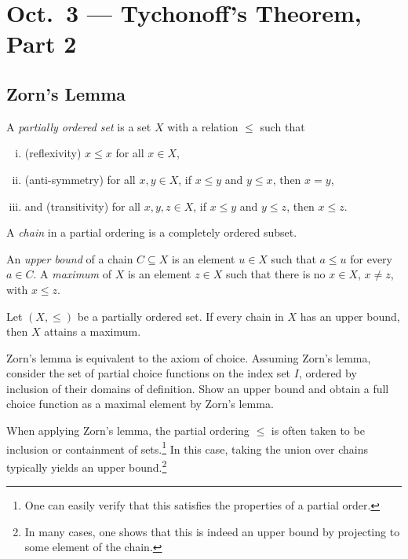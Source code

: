 \chapter{Oct.~3 --- Tychonoff's Theorem, Part 2}

\section{Zorn's Lemma}

\begin{definition}
  A \emph{partially ordered set} is a set $X$ with
  a relation $\le$ such that
  \begin{enumerate}[(i)]
    \item (reflexivity) $x \le x$ for all
      $x \in X$,
    \item (anti-symmetry) for all $x, y \in X$,
      if $x \le y$ and $y \le x$, then $x = y$,
    \item and (transitivity) for all $x, y, z \in X$,
      if $x \le y$ and $y \le z$, then $x \le z$.
  \end{enumerate}
\end{definition}

\begin{definition}
  A \emph{chain} in a partial ordering is a
  completely ordered subset.
\end{definition}

\begin{definition}
  An \emph{upper bound} of a chain $C \subseteq X$ is
  an element $u \in X$ such that $a \le u$
  for every $a \in C$. A \emph{maximum}
  of $X$ is an element $z \in X$ such that there
  is no $x \in X$, $x \ne z$, with $x \le z$.
\end{definition}

\begin{lemma}
  Let $(X, \le)$ be a partially ordered set.
  If every chain in $X$ has an upper bound, then
  $X$ attains a maximum.
\end{lemma}

\begin{remark}
  Zorn's lemma is equivalent to the axiom of choice.
  Assuming Zorn's lemma, consider the set of
  partial choice functions on the index set $I$,
  ordered by inclusion of their domains of
  definition. Show an upper bound and obtain a full
  choice function as a maximal element by Zorn's
  lemma.
\end{remark}

\begin{remark}
  When applying Zorn's lemma,
  the partial ordering $\le$ is often taken to be
  inclusion or containment of sets.\footnote{One can easily verify that this satisfies the properties of a partial order.} In this case,
  taking the union over chains typically yields
  an upper bound.\footnote{In many cases, one shows
  that this is indeed an upper bound by projecting
  to some element of the chain.}
\end{remark}


